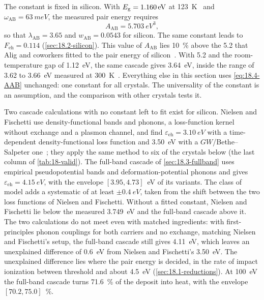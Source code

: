 The constant is fixed in silicon. With $E_{\mathrm{g}} = \SI{1.160}{eV}$ at \SI{123}{K}~\cite[Eq.~(11)]{ramanathan2020ionization} and $\omega_{\mathrm{AB}} = \SI{63}{meV}$, the measured pair energy requires
\begin{equation}
  A_{\mathrm{AB}} = \SI{5.703}{eV^3} ,
  \label{eq:18.4-AAB}
\end{equation}
so that $\lambda_{\mathrm{AB}} = 3.65$ and $w_{\mathrm{AB}} = 0.0543$ for silicon. The same constant leads to $F_{\mathrm{eh}} = 0.114$ (\cref{sec:18.2-silicon}). This value of $A_{\mathrm{AB}}$ lies \SI{10}{\percent} above the 5.2 that Alig and coworkers fitted to the pair energy of silicon~\cite[Sect.~II]{nielsen2026first}. With 5.2 and the room-temperature gap of \SI{1.12}{eV}, the same cascade gives \SI{3.64}{eV}, inside the range of 3.62 to \SI{3.66}{eV} measured at \SI{300}{K}~\cite[Table~I]{ramanathan2020ionization}. Everything else in this section uses \cref{eq:18.4-AAB} unchanged: one constant for all crystals. The universality of the constant is an assumption, and the comparison with other crystals tests it.

Two cascade calculations with no constant left to fit exist for silicon. Nielsen and Fischetti use density-functional bands and phonons, a loss-function kernel without exchange and a plasmon channel, and find $\varepsilon_{\mathrm{eh}} = \SI{3.10}{eV}$ with a time-dependent density-functional loss function and \SI{3.50}{eV} with a $GW$/Bethe--Salpeter one~\cite[Sect.~III]{nielsen2026first}; they apply the same method to six of the crystals below (the last column of \cref{tab:18-valid}). The full-band cascade of \cref{sec:18.3-fullband} uses empirical pseudopotential bands and deformation-potential phonons and gives $\varepsilon_{\mathrm{eh}} = \SI{4.15}{eV}$, with the envelope $[3.95, 4.73]$~eV of its variants. The class of model adds a systematic of at least $\pm\SI{0.4}{eV}$, taken from the shift between the two loss functions of Nielsen and Fischetti. Without a fitted constant, Nielsen and Fischetti lie below the measured \SI{3.749}{eV} and the full-band cascade above it. The two calculations do not meet even with matched ingredients: with first-principles phonon couplings for both carriers and no exchange, matching Nielsen and Fischetti's setup, the full-band cascade still gives \SI{4.11}{eV}, which leaves an unexplained difference of \SI{0.6}{eV} from Nielsen and Fischetti's \SI{3.50}{eV}. The unexplained difference lies where the pair energy is decided, in the rate of impact ionization between threshold and about \SI{4.5}{eV} (\cref{sec:18.1-reductions}). At \SI{100}{eV} the full-band cascade turns \SI{71.6}{\percent} of the deposit into heat, with the envelope $[70.2, 75.0]$~\si{\percent}.

